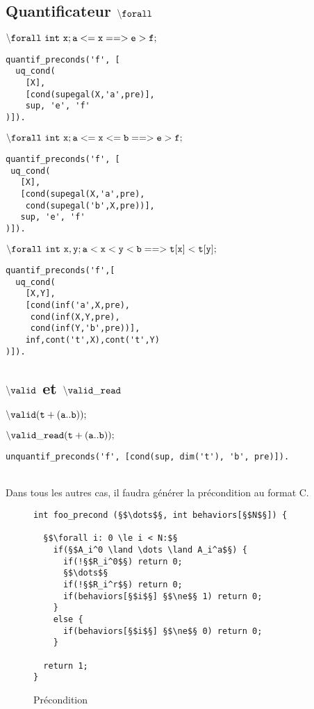 \subsection{Quantificateur ${\tt \backslash forall}$}

${\tt \backslash forall\ int\ x; a <= x ==> e > f;}$
\begin{lstlisting}
quantif_preconds('f', [
  uq_cond(    
    [X],
    [cond(supegal(X,'a',pre)],
    sup, 'e', 'f'
)]).
\end{lstlisting}

${\tt \backslash forall\ int\ x; a <= x <= b ==> e>f;}$
\begin{lstlisting}
quantif_preconds('f', [
 uq_cond(
   [X],
   [cond(supegal(X,'a',pre),
    cond(supegal('b',X,pre))],
   sup, 'e', 'f'
)]).
\end{lstlisting}

${\tt \backslash forall\ int\ x, y; a < x < y < b ==> t[x] < t[y];}$
\begin{lstlisting}
quantif_preconds('f',[
  uq_cond(
    [X,Y],
    [cond(inf('a',X,pre),
     cond(inf(X,Y,pre),
     cond(inf(Y,'b',pre))],
    inf,cont('t',X),cont('t',Y)
)]).
\end{lstlisting}

\subsection{${\tt \backslash valid}$ et ${\tt \backslash valid\_read}$}

${\tt \backslash valid(t+(a..b));}$

${\tt \backslash valid\_read(t+(a..b));}$
\begin{lstlisting}
unquantif_preconds('f', [cond(sup, dim('t'), 'b', pre)]).
\end{lstlisting}~\\


Dans tous les autres cas, il faudra générer la précondition au format C.\\

\begin{figure}[h]
  \begin{lstlisting}
int foo_precond (§$\dots$§, int behaviors[§$N$§]) {

  §$\forall i: 0 \le i < N:$§
    if(§$A_i^0 \land \dots \land A_i^a$§) {
      if(!§$R_i^0$§) return 0;
      §$\dots$§
      if(!§$R_i^r$§) return 0;
      if(behaviors[§$i$§] §$\ne$§ 1) return 0;
    }
    else {
      if(behaviors[§$i$§] §$\ne$§ 0) return 0;
    }

  return 1;
}
  \end{lstlisting}
  \caption{Précondition}
\end{figure}

